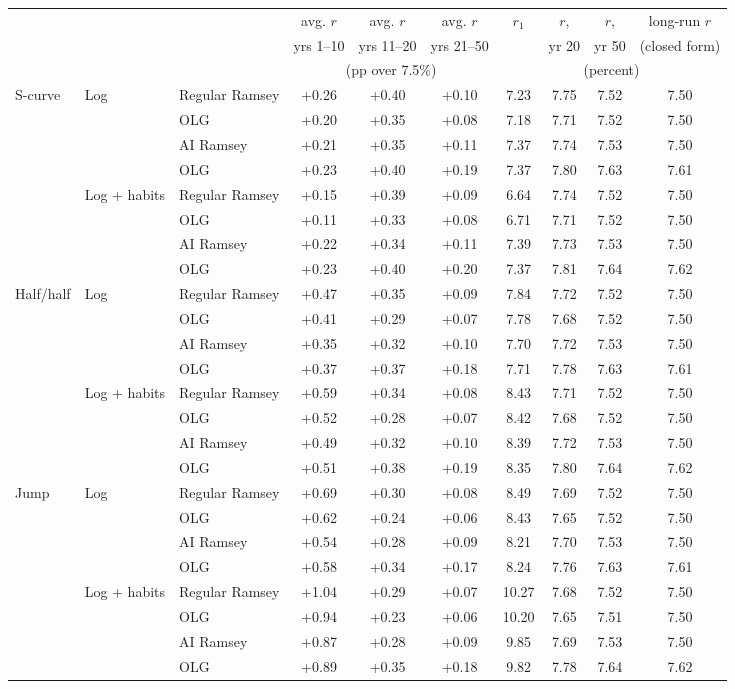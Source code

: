 \begin{tabular}{lllccccccc}\toprule
 & & & avg. $r$ & avg. $r$ & avg. $r$ & $r_1$ & $r$, & $r$, & long-run $r$\\
 & & & yrs 1--10 & yrs 11--20 & yrs 21--50 & & yr 20 & yr 50 & (closed form)\\
 & & & \multicolumn{3}{c}{(pp over 7.5\%)} & \multicolumn{4}{c}{(percent)}\\\midrule
S-curve & Log & Regular Ramsey & +0.26 & +0.40 & +0.10 & 7.23 & 7.75 & 7.52 & 7.50\\
 &  &  OLG & +0.20 & +0.35 & +0.08 & 7.18 & 7.71 & 7.52 & 7.50\\
 &  & AI Ramsey & +0.21 & +0.35 & +0.11 & 7.37 & 7.74 & 7.53 & 7.50\\
 &  &  OLG & +0.23 & +0.40 & +0.19 & 7.37 & 7.80 & 7.63 & 7.61\\
\addlinespace
 & Log + habits & Regular Ramsey & +0.15 & +0.39 & +0.09 & 6.64 & 7.74 & 7.52 & 7.50\\
 &  &  OLG & +0.11 & +0.33 & +0.08 & 6.71 & 7.71 & 7.52 & 7.50\\
 &  & AI Ramsey & +0.22 & +0.34 & +0.11 & 7.39 & 7.73 & 7.53 & 7.50\\
 &  &  OLG & +0.23 & +0.40 & +0.20 & 7.37 & 7.81 & 7.64 & 7.62\\
\midrule
Half/half & Log & Regular Ramsey & +0.47 & +0.35 & +0.09 & 7.84 & 7.72 & 7.52 & 7.50\\
 &  &  OLG & +0.41 & +0.29 & +0.07 & 7.78 & 7.68 & 7.52 & 7.50\\
 &  & AI Ramsey & +0.35 & +0.32 & +0.10 & 7.70 & 7.72 & 7.53 & 7.50\\
 &  &  OLG & +0.37 & +0.37 & +0.18 & 7.71 & 7.78 & 7.63 & 7.61\\
\addlinespace
 & Log + habits & Regular Ramsey & +0.59 & +0.34 & +0.08 & 8.43 & 7.71 & 7.52 & 7.50\\
 &  &  OLG & +0.52 & +0.28 & +0.07 & 8.42 & 7.68 & 7.52 & 7.50\\
 &  & AI Ramsey & +0.49 & +0.32 & +0.10 & 8.39 & 7.72 & 7.53 & 7.50\\
 &  &  OLG & +0.51 & +0.38 & +0.19 & 8.35 & 7.80 & 7.64 & 7.62\\
\midrule
Jump & Log & Regular Ramsey & +0.69 & +0.30 & +0.08 & 8.49 & 7.69 & 7.52 & 7.50\\
 &  &  OLG & +0.62 & +0.24 & +0.06 & 8.43 & 7.65 & 7.52 & 7.50\\
 &  & AI Ramsey & +0.54 & +0.28 & +0.09 & 8.21 & 7.70 & 7.53 & 7.50\\
 &  &  OLG & +0.58 & +0.34 & +0.17 & 8.24 & 7.76 & 7.63 & 7.61\\
\addlinespace
 & Log + habits & Regular Ramsey & +1.04 & +0.29 & +0.07 & 10.27 & 7.68 & 7.52 & 7.50\\
 &  &  OLG & +0.94 & +0.23 & +0.06 & 10.20 & 7.65 & 7.51 & 7.50\\
 &  & AI Ramsey & +0.87 & +0.28 & +0.09 & 9.85 & 7.69 & 7.53 & 7.50\\
 &  &  OLG & +0.89 & +0.35 & +0.18 & 9.82 & 7.78 & 7.64 & 7.62\\
\midrule
\bottomrule\end{tabular}
